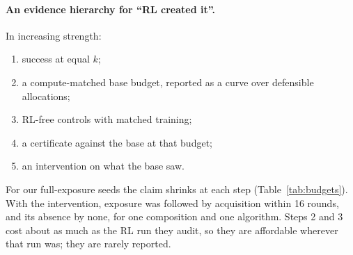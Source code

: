 \paragraph{An evidence hierarchy for ``RL created it''.} In increasing strength:
\begin{enumerate}
\item success at equal $k$;
\item a compute-matched base budget, reported as a curve over defensible allocations;
\item RL-free controls with matched training;
\item a certificate against the base at that budget;
\item an intervention on what the base saw.
\end{enumerate}
For our full-exposure seeds the claim shrinks at each step (Table~\ref{tab:budgets}). With the intervention, exposure was
followed by acquisition within 16 rounds, and its absence by none, for one composition and one algorithm. Steps 2 and 3
cost about as much as the RL run they audit, so they are affordable wherever that run was; they are rarely reported.
